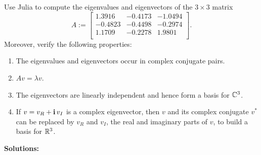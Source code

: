 \Qed


\bigskip


\begin{example} 
Use Julia to compute the eigenvalues and eigenvectors of the $3 \times 3$ matrix 
$$A:=\left[
\begin{array}{rrr}
1.3916 & -0.4173 & -1.0494 \\
-0.4823 & -0.4498 & -0.2974 \\
1.1709 & -0.2278 & 1.9801 \\
\end{array}
\right].$$
Moreover, verify the following properties:
\begin{enumerate}
\renewcommand{\labelenumi}{(\alph{enumi})}
\setlength{\itemsep}{.2cm}
    \item The eigenvalues and eigenvectors occur in complex conjugate pairs.
    \item $Av = \lambda v$.
    \item The eigenvectors are linearly independent and hence form a basis for $\mathbb C^3$.
    \item If $v=v_R + \mathop{\bm{\mathrm i}} v_I$ is a complex eigenvector, then $v$  and its complex conjugate $v^\ast$ can be replaced by $v_R$ and $v_I$, the real and imaginary parts of $v$, to build a basis for $\mathbb R^3$.
\end{enumerate}
\end{example}
\textbf{Solutions:}


